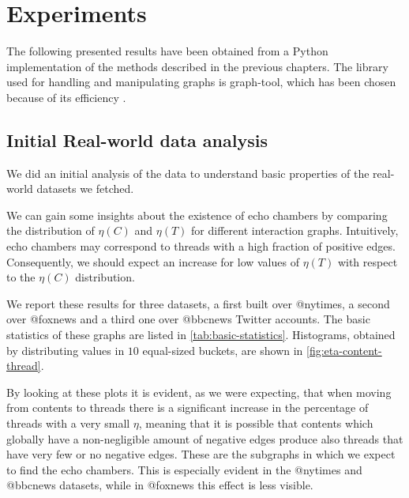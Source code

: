 \section{Experiments}

The following presented results have been obtained from a Python
implementation of the methods described in the previous chapters. The library used
for handling and manipulating graphs is graph-tool, which has been chosen
because of its efficiency \cite{peixoto_graph-tool_2014}.

\subsection{Initial Real-world data analysis}%
\label{sub:validity_problem_definition}

We did an initial analysis of the data to understand basic properties of the
real-world datasets we fetched.

We can gain some insights about the existence of echo chambers by comparing
the distribution of $\eta(C)$ and $\eta(T)$ for different interaction graphs.
Intuitively, echo chambers may correspond to threads with a
high fraction of positive edges. Consequently, we should expect an increase
for low values of $\eta(T)$ with respect to the $\eta(C)$ distribution.

We report these results for
three datasets, a first built over @nytimes, a second over @foxnews
and a third one over @bbcnews Twitter accounts\footnotemark. The basic
statistics of these graphs are listed in \autoref{tab:basic-statistics}. Histograms, obtained
by distributing values in $10$ equal-sized buckets, are shown in \autoref{fig:eta-content-thread}.


By looking at these plots it is evident, as we were expecting, that when
moving from
contents to threads there is a significant increase in the percentage of
threads with a very small $\eta$, meaning that it is possible that contents which
globally have
a non-negligible amount of negative edges produce also threads that have
very few or no negative edges. These are the subgraphs in which we expect to
find the echo chambers. This is especially evident in the @nytimes and @bbcnews
datasets, while in @foxnews this effect is less visible.

